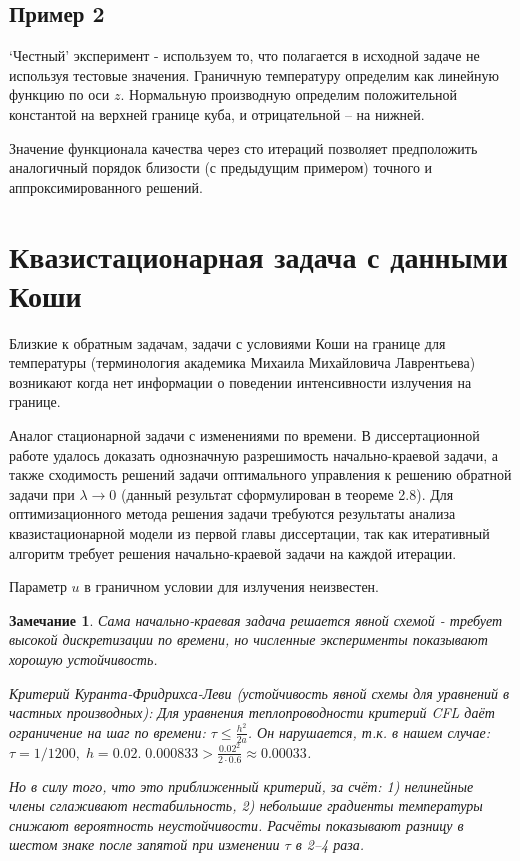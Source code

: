\documentclass[8pt,a4paper]{article}
\newtheorem*{remark}{Замечание}
\begin{document}
    \subsection*{Пример 2}
    `Честный' эксперимент - используем то, что полагается в исходной задаче не используя тестовые значения.
    Граничную температуру определим как линейную функцию по оси $z$.
    Нормальную производную определим положительной константой на верхней границе куба, и отрицательной -- на нижней.

    Значение функционала качества через сто итераций позволяет предположить аналогичный порядок
    близости (с предыдущим примером) точного и аппроксимированного решений.


    \section*{Квазистационарная задача с данными Коши}
    Близкие к обратным задачам, задачи с условиями Коши на границе для температуры
    (терминология академика Михаила Михайловича Лаврентьева) возникают когда нет информации
    о поведении интенсивности излучения на границе.

    Аналог стационарной задачи с изменениями по времени.
    В диссертационной работе удалось доказать однозначную разрешимость начально-краевой задачи,
    а также сходимость решений задачи оптимального управления к решению обратной задачи при $\lambda \to 0$
    (данный результат сформулирован в теореме 2.8).
    Для оптимизационного метода решения задачи требуются результаты анализа квазистационарной
    модели из первой главы диссертации, так как итеративный алгоритм требует
    решения начально-краевой задачи на каждой итерации.

    Параметр $u$ в граничном условии для излучения неизвестен.

    \begin{remark}
        Сама начально-краевая задача решается явной схемой - требует высокой дискретизации по времени,
        но численные эксперименты показывают хорошую устойчивость.

        Критерий Куранта-Фридрихса-Леви (устойчивость явной схемы для уравнений в частных производных):
        Для уравнения теплопроводности критерий CFL даёт ограничение на шаг по времени: $\tau \leq \frac{h^2}{2a}$.
        Он нарушается, т.к. в нашем случае:
        $\tau = 1/1200,\; h = 0.02. \; 0.000833 > \frac{0.02 ^ 2}{2 \cdot 0.6} \approx 0.00033$.

        Но в силу того, что это приближенный критерий,
        за счёт:
        1) нелинейные члены сглаживают нестабильность,
        2) небольшие градиенты температуры снижают вероятность неустойчивости.
        Расчёты показывают разницу в шестом знаке после запятой при изменении $\tau$ в 2--4 раза.
    \end{remark}
\end{document}
